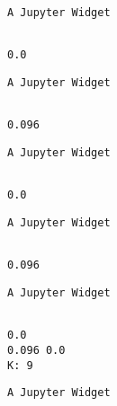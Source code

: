 \documentclass[11pt]{article}
\begin{document}
    
    \begin{verbatim}
A Jupyter Widget
    \end{verbatim}

    
    \begin{Verbatim}[commandchars=\\\{\}]

0.0

    \end{Verbatim}

    
    \begin{verbatim}
A Jupyter Widget
    \end{verbatim}

    
    \begin{Verbatim}[commandchars=\\\{\}]

0.096

    \end{Verbatim}

    
    \begin{verbatim}
A Jupyter Widget
    \end{verbatim}

    
    \begin{Verbatim}[commandchars=\\\{\}]

0.0

    \end{Verbatim}

    
    \begin{verbatim}
A Jupyter Widget
    \end{verbatim}

    
    \begin{Verbatim}[commandchars=\\\{\}]

0.096

    \end{Verbatim}

    
    \begin{verbatim}
A Jupyter Widget
    \end{verbatim}

    
    \begin{Verbatim}[commandchars=\\\{\}]

0.0
0.096 0.0
K: 9

    \end{Verbatim}

    
    \begin{verbatim}
A Jupyter Widget
    \end{verbatim}
\end{document}
